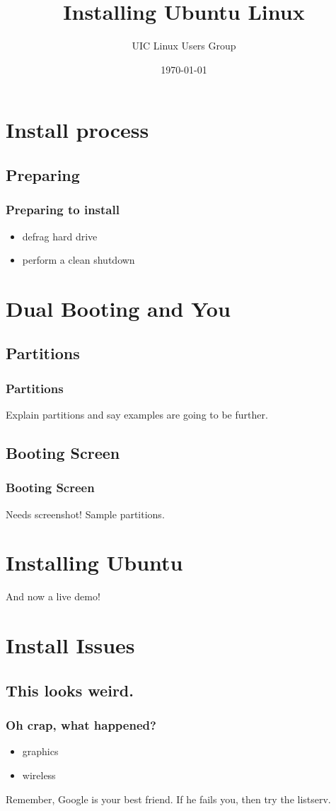 \documentclass[hyperref={pdfpagelabels=false}]{beamer}
\title{Installing Ubuntu Linux}
\author{UIC Linux Users Group}
\date{\today}
\begin{document}
\frame{\titlepage}
\section[outline]{}
\frame[allowframebreaks]{\tableofcontents}
\section{Install process}
\subsection{Preparing}
\frame
{
    \frametitle{Preparing to install}
    \begin{itemize}
    \item{defrag hard drive}
    \item{perform a clean shutdown}
    \end{itemize}
}
\section{Dual Booting and You}
\subsection{Partitions}
\frame
{
	\frametitle{Partitions}
	Explain partitions and say examples are going to be further.
}
\subsection{Booting Screen}
\frame
{
	\frametitle{Booting Screen}
	Needs screenshot! Sample partitions.
}
\section{Installing Ubuntu}
\frame
{
	And now a live demo!
}
\section{Install Issues}
\subsection{This looks weird.}
\frame
{
	\frametitle{Oh crap, what happened?}
	\begin{itemize}
	\item{graphics}
	\item{wireless}
	\end{itemize}
	Remember, Google is your best friend. If he fails you, then try the listserv.
}
\end{document}
